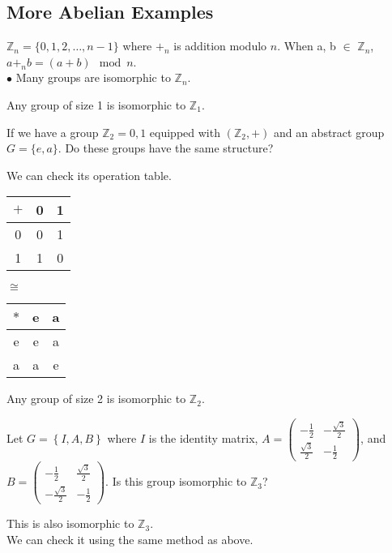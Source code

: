 \subsection{More Abelian Examples}

\begin{eg}
    $\mathbb{Z}_n = \{0, 1, 2, \ldots, n-1\}$ where $+_n$ is addition modulo $n$.
    When a, b $\in$ $\mathbb{Z}_n$, $a +_n b = (a + b) \mod n$.\\
    $\bullet$ Many groups are isomorphic to $\mathbb{Z}_n$.
\end{eg}

\begin{remark}[Fact]
    Any group of size 1 is isomorphic to $\mathbb{Z}_1$.
\end{remark}

\begin{eg}
    If we have a group $\mathbb{Z}_2 = {0, 1}$ equipped with $(\mathbb{Z}_2, +)$ and an abstract group $G = \{e, a\}$. Do these groups have the same structure?\\
\end{eg}
\begin{answer}
    We can check its operation table.\\
    \begin{center}
        \begin{tabular}{c|cc}
            $+$ & 0 & 1\\
            \hline
            0 & 0 & 1\\
            1 & 1 & 0
        \end{tabular}
        \quad $\cong$ \quad
        \begin{tabular}{c|cc}
            $*$ & e & a\\
            \hline
            e & e & a\\
            a & a & e
        \end{tabular}
    \end{center}
\end{answer}

\begin{remark}[Fact]
    Any group of size 2 is isomorphic to $\mathbb{Z}_2$.
\end{remark}

\begin{eg}
    Let $G = \left\{ I, A, B \right\}$ where $I$ is the identity matrix, 
    $A = \begin{pmatrix} -\frac{1}{2} & -\frac{\sqrt{3}}{2} \\ \frac{\sqrt{3}}{2} & -\frac{1}{2} \end{pmatrix}$, and 
    $B = \begin{pmatrix} -\frac{1}{2} & \frac{\sqrt{3}}{2} \\ -\frac{\sqrt{3}}{2} & -\frac{1}{2} \end{pmatrix}$.
    Is this group isomorphic to $\mathbb{Z}_3$?\\
\end{eg}
\begin{answer}
    This is also isomorphic to $\mathbb{Z}_3$.\\ We can check it using the same method as above.
\end{answer}

